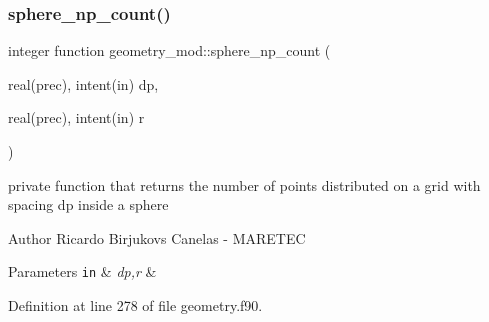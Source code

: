 \subsubsection{\texorpdfstring{sphere\+\_\+np\+\_\+count()}{sphere\_np\_count()}}
{\footnotesize\ttfamily integer function geometry\+\_\+mod\+::sphere\+\_\+np\+\_\+count (\begin{DoxyParamCaption}\item[{real(prec), intent(in)}]{dp,  }\item[{real(prec), intent(in)}]{r }\end{DoxyParamCaption})\hspace{0.3cm}{\ttfamily [private]}}



private function that returns the number of points distributed on a grid with spacing dp inside a sphere 

\begin{DoxyAuthor}{Author}
Ricardo Birjukovs Canelas -\/ M\+A\+R\+E\+T\+EC
\end{DoxyAuthor}

\begin{DoxyParams}[1]{Parameters}
\mbox{\tt in}  & {\em dp,r} & \\
\hline
\end{DoxyParams}


Definition at line 278 of file geometry.\+f90.



